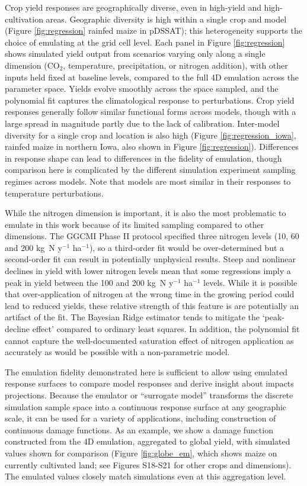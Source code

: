 \documentclass[gmd, manuscript]{copernicus} %
\begin{document}
Crop yield responses are geographically diverse, even in high-yield and high-cultivation areas. 
Geographic diversity is high within a single crop and model (Figure \ref{fig:regression} rainfed maize in pDSSAT); this heterogeneity supports the choice of emulating at the grid cell level. 
Each panel in Figure \ref{fig:regression} shows simulated yield output from scenarios varying only along a single dimension (CO$_2$, temperature, precipitation, or nitrogen addition), with other inputs held fixed at baseline levels, compared to the full 4D emulation across the parameter space. 
Yields evolve smoothly across the space sampled, and the polynomial fit captures the climatological response to perturbations. 
Crop yield responses generally follow similar functional forms across models, though with a large spread in magnitude partly due to the lack of calibration. 
Inter-model diversity for a single crop and location is also high (Figure \ref{fig:regression_iowa}, rainfed maize in northern Iowa, also shown in Figure \ref{fig:regression}). 
Differences in response shape can lead to  differences in the fidelity of emulation, though comparison here is complicated by the different simulation experiment sampling regimes across models. 
Note that models are most similar in their responses to temperature perturbations. 

While the nitrogen dimension is important, it is also the most problematic to emulate in this work because of its limited sampling compared to other dimensions. 
The GGCMI Phase II protocol specified three nitrogen levels (10, 60 and 200 kg~N y$^{-1}$ ha$^{-1}$), so a third-order fit would be over-determined but a second-order fit can result in potentially unphysical results. 
Steep and nonlinear declines in yield with lower nitrogen levels mean that some regressions imply a peak in yield between the 100 and 200 kg~N y$^{-1}$ ha$^{-1}$ levels. 
While it is possible that over-application of nitrogen at the wrong time in the growing period could lead to reduced yields, these relative strength of this feature is are potentially an artifact of the fit. 
The Bayesian Ridge estimator tends to mitigate the `peak-decline effect' compared to ordinary least squares. 
In addition, the polynomial fit cannot capture the well-documented saturation effect of nitrogen application \citep[e.g.][]{Torsten77} as accurately as would be possible with a non-parametric model. 

The emulation fidelity demonstrated here is sufficient to allow using emulated response surfaces to compare model responses and derive insight about impacts projections. 
Because the emulator or ``surrogate model'' transforms the discrete simulation sample space into a continuous response surface at any geographic scale, it can be used for a variety of applications, including construction of continuous damage functions. 
As an example, we show a damage function constructed from the 4D emulation, aggregated to global yield, with simulated values shown for comparison (Figure \ref{fig:globe_em}, which shows maize on currently cultivated land; see Figures S18-S21 for other crops and dimensions). 
The emulated values closely match simulations even at this aggregation level.
\end{document}
